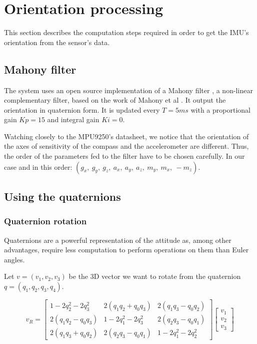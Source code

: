 \documentclass{article}
\begin{document}
\section{Orientation processing}

This section describes the computation steps required in order to get the IMU's orientation from the sensor's data.

\subsection{Mahony filter}

The system uses an open source implementation of a Mahony filter \cite{ximu_library}, a non-linear complementary filter, based on the work of Mahony et al \cite{mahony_filter}. It output the orientation in quaternion form. It is updated every $T = 5ms$ with a proportional gain $Kp = 15$ and integral gain $Ki = 0$.

\vspace{\baselineskip}

Watching closely to the MPU9250's datasheet, we notice that the orientation of the axes of sensitivity of the compass and the accelerometer are different. Thus, the order of the parameters fed to the filter have to be chosen carefully. In our case and in this order: $(g_x,\ g_y,\ g_z,\ a_x,\ a_y,\ a_z,\ m_y,\ m_x,\ -m_z)$.

\subsection{Using the quaternions}

\subsubsection{Quaternion rotation} \label{sub_sub_sect_quat_rot}

Quaternions are a powerful representation of the attitude as, among other advantages, require less computation to perform operations on them than Euler angles.

\vspace{\baselineskip}

\noindent
Let $v = (v_{1}, v_{2}, v_{3})$ be the 3D vector we want to rotate from the quaternion $q = (q_{1}, q_{2}, q_{3}, q_{4})$.

$$ v_{R} = 
\begin{bmatrix}
    1-2q_{2}^{2}-2q_{3}^{2}     &  2(q_{1}q_{2} + q_{0}q_{3})  &  2(q_{1}q_{3} - q_{0}q_{2}) \\
    2(q_{1}q_{2} - q_{0}q_{3})  &  1-2q_{1}^{2}-2q_{3}^{2}     &  2(q_{2}q_{3} - q_{0}q_{1}) \\
    2(q_{1}q_{3} + q_{0}q_{2})  &  2(q_{2}q_{3} - q_{0}q_{1})  &  1-2q_{1}^{2}-2q_{2}^{2}   
\end{bmatrix}
\begin{bmatrix}
    v_{1} \\
    v_{2} \\
    v_{3}   
\end{bmatrix}
$$
\end{document}
